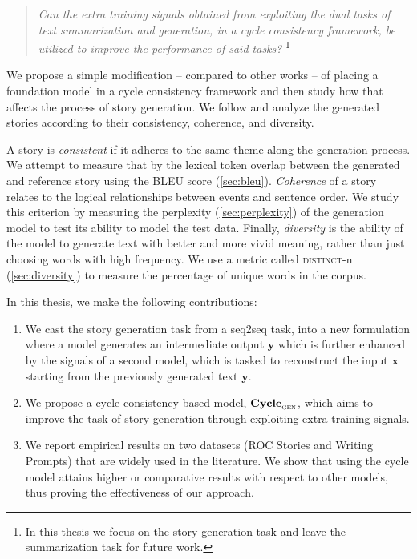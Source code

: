 \begin{quote}
\textit{Can the extra training signals obtained from exploiting the dual tasks of text summarization and generation, in a cycle consistency framework, be utilized to improve the performance of said tasks?} \footnote{In this thesis we focus on the story generation task and leave the summarization task for future work.}
\end{quote}

We propose a simple modification -- compared to other works -- of placing a foundation model in a cycle consistency framework and then study how that affects the process of story generation. We follow \citep{hou2019survey} and analyze the generated stories according to their consistency, coherence, and diversity.

A story is \textit{consistent} if it adheres to the same theme along the generation process. We attempt to measure that by the lexical token overlap between the generated and reference story using the BLEU score (\cref{sec:bleu}). \textit{Coherence} of a story relates to the logical relationships between events and sentence order. We study this criterion by measuring the perplexity (\cref{sec:perplexity}) of the generation model to test its ability to model the test data. %
Finally, \textit{diversity} is the ability of the model to generate text with better and more vivid meaning, rather than just choosing words with high frequency. We use a metric called \textsc{distinct}-n (\cref{sec:diversity}) to measure the percentage of unique words in the corpus.

In this thesis, we make the following contributions:

\begin{enumerate}
\item We cast the story generation task from a seq2seq task, into a new formulation where a model generates an intermediate output $\mathbf{y}$ which is further enhanced by the signals of a second model, which is tasked to reconstruct the input $\mathbf{x}$ starting from the previously generated text $\mathbf{y}$.

\item We propose a cycle-consistency-based model, $\textbf{Cycle}_{\textsc{gen}}$, which aims to improve the task of story generation through exploiting extra training signals.

\item We report empirical results on two datasets (ROC Stories and Writing Prompts) that are widely used in the literature. We show that using the cycle model attains higher or comparative results with respect to other models, thus proving the effectiveness of our approach.
\end{enumerate}

